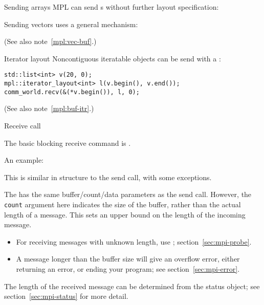 \begin{mplnote}{Sending arrays}
  \ac{MPL} can send s
  without further layout specification:

  Sending vectors uses a general mechanism:
  
  (See also note~\ref{mpl:vec-buf}.)
\end{mplnote}

\begin{comment}
  \begin{mplnote}{Iterator buffers}
    It is possible to to send containers by iterators
    \cxxverbatimsnippet[examples/mpi/mpl/sendrange.cxx]{mplsendrange}
  \end{mplnote}
\end{comment}

\begin{mplnote}{Iterator layout}
  Noncontiguous iteratable objects can be send with a
  :
\begin{lstlisting}
std::list<int> v(20, 0);
mpl::iterator_layout<int> l(v.begin(), v.end());
comm_world.recv(&(*v.begin()), l, 0);  
\end{lstlisting}
(See also note~\ref{mpl:buf-itr}.)
\end{mplnote}

 {Receive call}

The basic blocking receive command is
.

An example:
%

This is similar in structure to the send call, with some exceptions.

The  has the same buffer/count/data parameters as the send
call.
However, 
the \lstinline{count} argument here indicates the size of the buffer,
rather than the actual length of a message.
This sets an upper bound on the length of the incoming message.
\begin{itemize}
\item For receiving messages with unknown length, use ;
  section~\ref{sec:mpi-probe}.
\item A message longer than the buffer size will give an overflow error,
  either returning an error, or ending your program; see section~\ref{sec:mpi-error}.
\end{itemize}
The length of the received message can be determined 
from the status object; see section~\ref{sec:mpi-status} for more detail.

